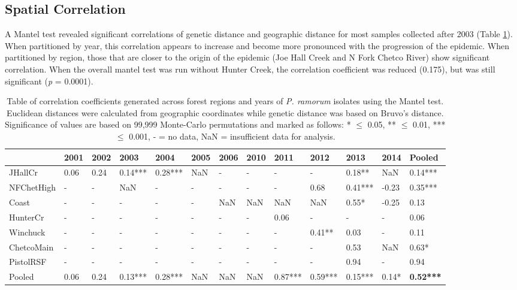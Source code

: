\documentclass[double,12pt]{beavtex}
\begin{document}
  \subsection{Spatial Correlation}\label{spatial-correlation}
  
  A Mantel test revealed significant correlations of genetic distance and
  geographic distance for most samples collected after 2003 (Table
  \ref{tab:ramorum3}). When partitioned by year, this correlation appears
  to increase and become more pronounced with the progression of the
  epidemic. When partitioned by region, those that are closer to the
  origin of the epidemic (Joe Hall Creek and N Fork Chetco River) show
  significant correlation. When the overall mantel test was run without
  Hunter Creek, the correlation coefficient was reduced (0.175), but was
  still significant (\emph{p} = 0.0001).
  
  \begin{table}
  \centering
  \begin{tabular}{@{}lllllllllllll@{}}
  \toprule
  & \textbf{2001} & \textbf{2002} & \textbf{2003} & \textbf{2004} &
  \textbf{2005} & \textbf{2006} & \textbf{2010} & \textbf{2011} &
  \textbf{2012} & \textbf{2013} & \textbf{2014} &
  \textbf{Pooled}\tabularnewline
  \midrule
  JHallCr & 0.06 & 0.24 & 0.14*** & 0.28*** & NaN & - & - & - & - & 0.18**
  & NaN & 0.14***\tabularnewline
  NFChetHigh & - & - & NaN & - & - & - & - & - & 0.68 & 0.41*** & -0.23 &
  0.35***\tabularnewline
  Coast & - & - & - & - & - & NaN & NaN & NaN & NaN & 0.55* & -0.25 &
  0.13\tabularnewline
  HunterCr & - & - & - & - & - & - & - & 0.06 & - & - & - &
  0.06\tabularnewline
  Winchuck & - & - & - & - & - & - & - & - & 0.41** & 0.03 & - &
  0.11\tabularnewline
  ChetcoMain & - & - & - & - & - & - & - & - & - & 0.53 & NaN &
  0.63*\tabularnewline
  PistolRSF & - & - & - & - & - & - & - & - & - & 0.94 & - &
  0.94\tabularnewline
  Pooled & 0.06 & 0.24 & 0.13*** & 0.28*** & NaN & NaN & NaN & 0.87*** &
  0.59*** & 0.15*** & 0.14* & \textbf{0.52***}\tabularnewline
  \bottomrule
  \end{tabular}
  \caption[Table of correlation coefficients generated across
  forest regions and years of \emph{P. ramorum} isolates using the Mantel
  test.]{Table of correlation coefficients generated across
  forest regions and years of \emph{P. ramorum} isolates using the Mantel
  test. Euclidean distances were calculated from geographic coordinates
  while genetic distance was based on Bruvo's distance. Significance of
  values are based on 99,999 Monte-Carlo permutations and marked as
  follows: * $\leq$ 0.05, ** $\leq$ 0.01, *** $\leq$ 0.001, - = no data, NaN =
  insufficient data for analysis.}
  \label{tab:ramorum3}
  \end{table}
  
\end{document}

